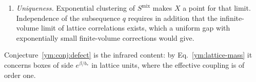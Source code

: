 \begin{enumerate}
 reconstructed theory needs in addition that such vectors $A\Omega$ be dense,
 control of the vacuum subtraction, the identification of the limit state
 with the one of Theorem~\ref{ym:thm:existence} through the convergence
 \eqref{ym:ordered-limit}, and, with Proposition~\ref{ym:prop:gap-decay},
 the decay for the renormalized insertions with constants uniform in the
 cutoff; then Eq.~\eqref{ym:gap-statement} follows for the reconstructed
 theory.
\item \emph{Uniqueness.} Exponential clustering of $S^{\mathrm{mix}}$ makes
 $X$ a point for that limit. Independence of the subsequence $q$ requires in
 addition that the infinite-volume limit of lattice correlations exists,
 which a uniform gap with exponentially small finite-volume corrections
 would give.
\end{enumerate}
Conjecture~\ref{ym:conj:defect} is the infrared content: by
Eq.~\eqref{ym:lattice-mass} it concerns boxes of side $e^{\beta/b_*}$ in
lattice units, where the effective coupling is of order one.

